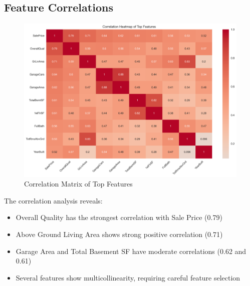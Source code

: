 \documentclass[12pt]{report}
\begin{document}
\subsection{Feature Correlations}
\begin{figure}[H]
    \centering
    \includegraphics[width=1.0\textwidth]{figures/correlation_matrix.png}
    \caption{Correlation Matrix of Top Features}
    \label{fig:correlation_matrix}
\end{figure}

The correlation analysis reveals:
\begin{itemize}
    \item Overall Quality has the strongest correlation with Sale Price (0.79)
    \item Above Ground Living Area shows strong positive correlation (0.71)
    \item Garage Area and Total Basement SF have moderate correlations (0.62 and 0.61)
    \item Several features show multicollinearity, requiring careful feature selection
\end{itemize}
\end{document}
